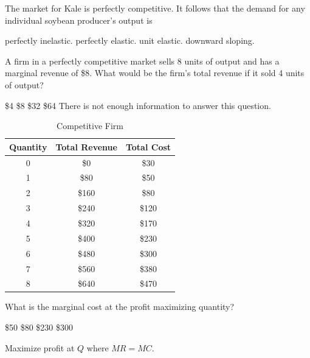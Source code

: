 \documentclass[addpoints,11pt]{exam}
\theoremstyle{definition}
\begin{document}
\begin{questions}
\question The market for Kale is perfectly competitive. It follows that the demand for any individual soybean producer's output is 

\begin{choices}
	\choice perfectly inelastic.
	\CorrectChoice perfectly elastic.
	\choice unit elastic.
	\choice downward sloping.
\end{choices}

\question A firm in a perfectly competitive market sells 8 units of output and has a marginal revenue of \$8. What would be the firm's total revenue if it sold 4 units of output?

\begin{choices}
	\choice \$4
	\choice \$8
	\CorrectChoice \$32
	\choice \$64
	\choice There is not enough information to answer this question.
\end{choices}
		
				\begin{table}[H]
							\centering
							\caption{Competitive Firm}
							\label{tab2}
							\begin{tabular}{ c|c|c}        
								
								Quantity & Total Revenue & Total Cost  \\
								\hline
								0 & \$0  & \$30 \\
								1 & \$80 & \$50 \\
								2 & \$160 & \$80 \\
								3 & \$240 & \$120 \\
								4 & \$320 & \$170  \\
								5 & \$400 & \$230 \\
								6 & \$480 & \$300  \\
								7 & \$560 & \$380 \\
								8 & \$640 & \$470   \\
							\end{tabular}
						\end{table} 
						
\newpage

			
			\question \label{blah1} What is the marginal cost at the profit maximizing quantity?
			\begin{choices}
				\choice \$50
				\CorrectChoice \$80
				\choice \$230
				\choice \$300
			\end{choices}
			
			\begin{solution}
				Maximize profit at $Q$ where $MR = MC.$
			\end{solution}
			

\end{questions}
\end{document}
